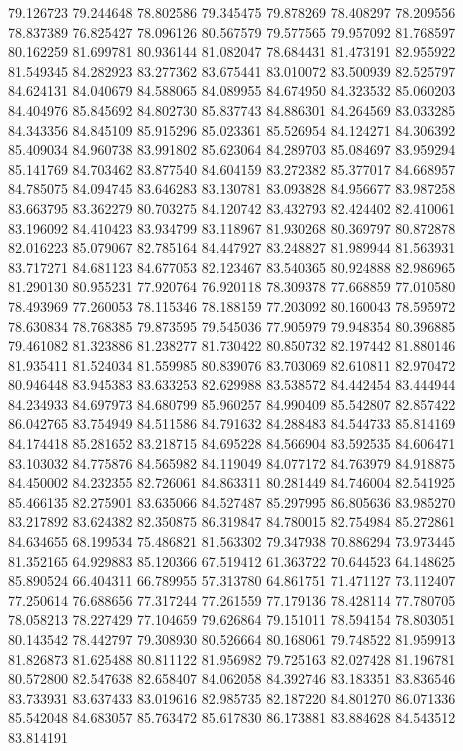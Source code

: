 79.126723
79.244648
78.802586
79.345475
79.878269
78.408297
78.209556
78.837389
76.825427
78.096126
80.567579
79.577565
79.957092
81.768597
80.162259
81.699781
80.936144
81.082047
78.684431
81.473191
82.955922
81.549345
84.282923
83.277362
83.675441
83.010072
83.500939
82.525797
84.624131
84.040679
84.588065
84.089955
84.674950
84.323532
85.060203
84.404976
85.845692
84.802730
85.837743
84.886301
84.264569
83.033285
84.343356
84.845109
85.915296
85.023361
85.526954
84.124271
84.306392
85.409034
84.960738
83.991802
85.623064
84.289703
85.084697
83.959294
85.141769
84.703462
83.877540
84.604159
83.272382
85.377017
84.668957
84.785075
84.094745
83.646283
83.130781
83.093828
84.956677
83.987258
83.663795
83.362279
80.703275
84.120742
83.432793
82.424402
82.410061
83.196092
84.410423
83.934799
83.118967
81.930268
80.369797
80.872878
82.016223
85.079067
82.785164
84.447927
83.248827
81.989944
81.563931
83.717271
84.681123
84.677053
82.123467
83.540365
80.924888
82.986965
81.290130
80.955231
77.920764
76.920118
78.309378
77.668859
77.010580
78.493969
77.260053
78.115346
78.188159
77.203092
80.160043
78.595972
78.630834
78.768385
79.873595
79.545036
77.905979
79.948354
80.396885
79.461082
81.323886
81.238277
81.730422
80.850732
82.197442
81.880146
81.935411
81.524034
81.559985
80.839076
83.703069
82.610811
82.970472
80.946448
83.945383
83.633253
82.629988
83.538572
84.442454
83.444944
84.234933
84.697973
84.680799
85.960257
84.990409
85.542807
82.857422
86.042765
83.754949
84.511586
84.791632
84.288483
84.544733
85.814169
84.174418
85.281652
83.218715
84.695228
84.566904
83.592535
84.606471
83.103032
84.775876
84.565982
84.119049
84.077172
84.763979
84.918875
84.450002
84.232355
82.726061
84.863311
80.281449
84.746004
82.541925
85.466135
82.275901
83.635066
84.527487
85.297995
86.805636
83.985270
83.217892
83.624382
82.350875
86.319847
84.780015
82.754984
85.272861
84.634655
68.199534
75.486821
81.563302
79.347938
70.886294
73.973445
81.352165
64.929883
85.120366
67.519412
61.363722
70.644523
64.148625
85.890524
66.404311
66.789955
57.313780
64.861751
71.471127
73.112407
77.250614
76.688656
77.317244
77.261559
77.179136
78.428114
77.780705
78.058213
78.227429
77.104659
79.626864
79.151011
78.594154
78.803051
80.143542
78.442797
79.308930
80.526664
80.168061
79.748522
81.959913
81.826873
81.625488
80.811122
81.956982
79.725163
82.027428
81.196781
80.572800
82.547638
82.658407
84.062058
84.392746
83.183351
83.836546
83.733931
83.637433
83.019616
82.985735
82.187220
84.801270
86.071336
85.542048
84.683057
85.763472
85.617830
86.173881
83.884628
84.543512
83.814191

